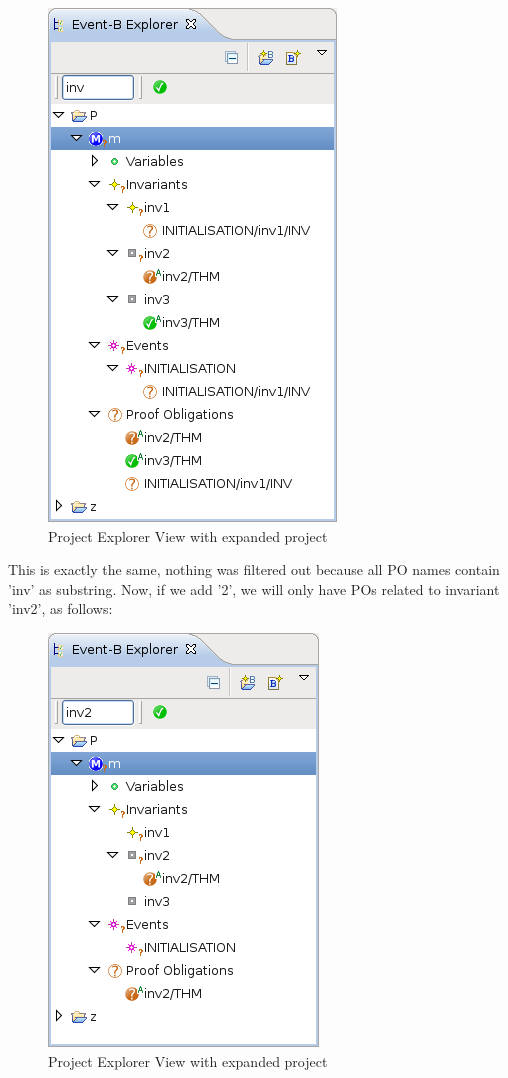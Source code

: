 \begin{figure}[!h]
\begin{center}
	\includegraphics{img/reference/ref_01_project_explorer5.png}
	\caption{Project Explorer View with expanded project}
	\label{fig_ref_01_project_explorer5}
\end{center}
\end{figure}

This is exactly the same, nothing was filtered out because all PO names contain 'inv' as substring. Now, if we add '2', we will only have POs related to invariant 'inv2', as follows: 

\begin{figure}[!h]
\begin{center}
	\includegraphics{img/reference/ref_01_project_explorer6.png}
	\caption{Project Explorer View with expanded project}
	\label{fig_ref_01_project_explorer6}
\end{center}
\end{figure}

